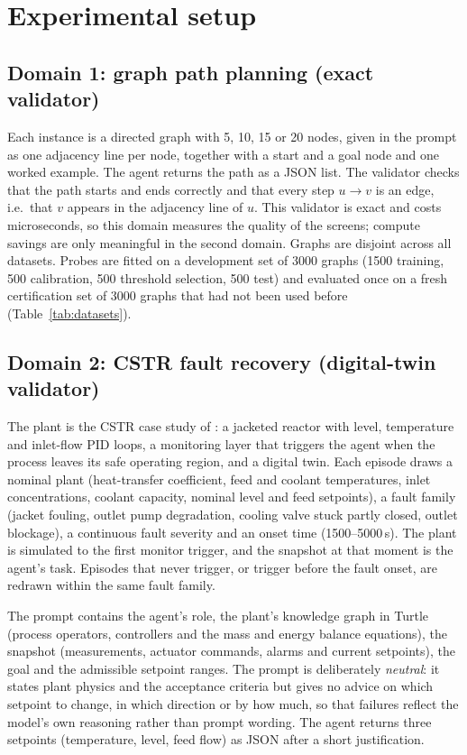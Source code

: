 \section{Experimental setup}\label{sec:setup}

\subsection{Domain 1: graph path planning (exact validator)}
Each instance is a directed graph with 5, 10, 15 or 20 nodes, given in the prompt as one adjacency line per node,
together with a start and a goal node and one worked example. The agent returns the path as a JSON list. The
validator checks that the path starts and ends correctly and that every step $u\to v$ is an edge, i.e.\ that $v$
appears in the adjacency line of $u$. This validator is exact and costs microseconds, so this domain measures the
quality of the screens; compute savings are only meaningful in the second domain. Graphs are disjoint across all
datasets. Probes are fitted on a development set of 3000 graphs (1500 training, 500 calibration, 500 threshold
selection, 500 test) and evaluated once on a fresh certification set of 3000 graphs that had not been used before
(Table~\ref{tab:datasets}).

\subsection{Domain 2: CSTR fault recovery (digital-twin validator)}
The plant is the CSTR case study of \citep{car_todo}: a jacketed reactor with level, temperature and inlet-flow PID
loops, a monitoring layer that triggers the agent when the process leaves its safe operating region, and a digital
twin. Each episode draws a nominal plant (heat-transfer coefficient, feed and coolant temperatures, inlet
concentrations, coolant capacity, nominal level and feed setpoints), a fault family (jacket fouling, outlet pump
degradation, cooling valve stuck partly closed, outlet blockage), a continuous fault severity and an onset time
(1500--5000\,s). The plant is simulated to the first monitor trigger, and the snapshot at that moment is the agent's
task. Episodes that never trigger, or trigger before the fault onset, are redrawn within the same fault family.

The prompt contains the agent's role, the plant's knowledge graph in Turtle (process operators, controllers and the
mass and energy balance equations), the snapshot (measurements, actuator commands, alarms and current setpoints),
the goal and the admissible setpoint ranges. The prompt is deliberately \emph{neutral}: it states plant physics and
the acceptance criteria but gives no advice on which setpoint to change, in which direction or by how much, so that
failures reflect the model's own reasoning rather than prompt wording. The agent returns three setpoints (temperature,
level, feed flow) as JSON after a short justification.

